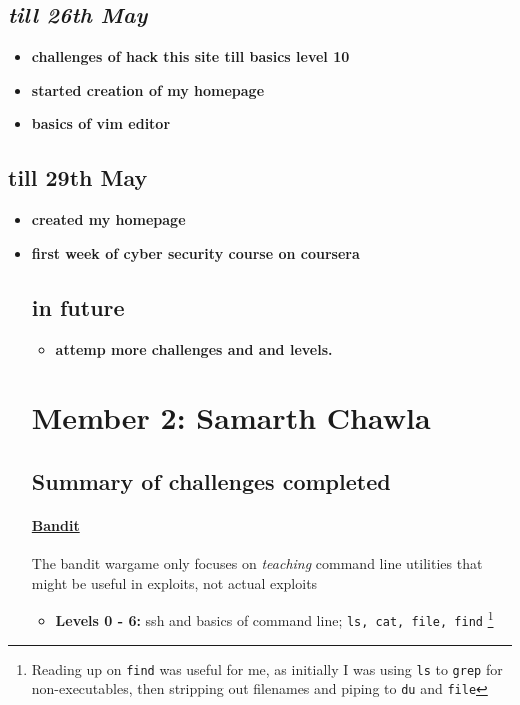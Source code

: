 \documentclass{article}
\def\code#1{\texttt{#1}}
\begin{document}
\subsection*{\textit{till 26th May}}
\begin{itemize}
    \item \textbf{challenges of hack this site till basics level 10}
    \item 
\textbf{started creation of my homepage}
    \item \textbf{basics of vim editor}
\end{itemize}
\subsection*{till 29th May}
\begin{itemize}
    \item \textbf{created my homepage}
    \item \textbf{first week of cyber security course on coursera}
\subsection*{in future}
\begin{itemize}
    \item \textbf{attemp more challenges and and levels.}
\end{itemize}

\newpage
\section*{Member 2: Samarth Chawla}
\subsection*{Summary of challenges completed}

\paragraph{\href{http://overthewire.org/wargames/bandit/}{Bandit}}
The bandit wargame only focuses on \textit{teaching} command line utilities that might be useful in exploits, not actual exploits
\begin{itemize}
    
    \item \textbf{Levels 0 - 6: } ssh and basics of command line; \code{ls, cat, file, find} \footnote{Reading up on \code{find} was useful for me, as initially I was using \code{ls} to \code{grep} for non-executables, then stripping out filenames and piping to \code{du} and \code{file}}
    

\end{itemize}
\end{itemize}
\end{document}
